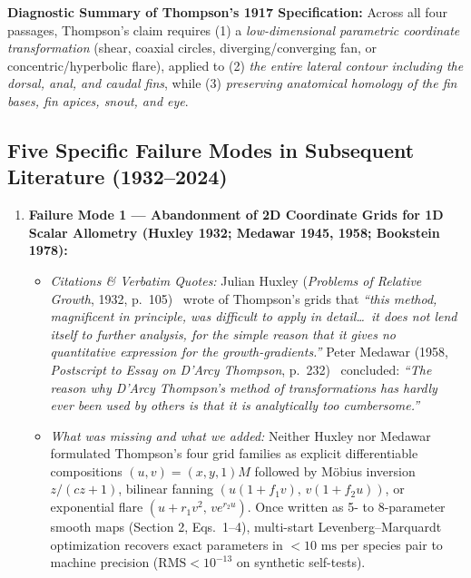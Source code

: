 \documentclass[11pt,a4paper]{article}
\theoremstyle{definition}
\theoremstyle{remark}
\begin{document}
\noindent\textbf{Diagnostic Summary of Thompson's 1917 Specification:} Across all four passages, Thompson's claim requires (1) a \emph{low-dimensional parametric coordinate transformation} (shear, coaxial circles, diverging/converging fan, or concentric/hyperbolic flare), applied to (2) \emph{the entire lateral contour including the dorsal, anal, and caudal fins}, while (3) \emph{preserving anatomical homology of the fin bases, fin apices, snout, and eye}.

\subsection{Five Specific Failure Modes in Subsequent Literature (1932--2024)}

\begin{enumerate}
  \item \textbf{Failure Mode 1 --- Abandonment of 2D Coordinate Grids for 1D Scalar Allometry (Huxley 1932; Medawar 1945, 1958; Bookstein 1978):}
  \begin{itemize}
    \item \emph{Citations \& Verbatim Quotes:} Julian Huxley (\emph{Problems of Relative Growth}, 1932, p.\ 105)~\cite{Huxley1932} wrote of Thompson's grids that \emph{``this method, magnificent in principle, was difficult to apply in detail\dots\ it does not lend itself to further analysis, for the simple reason that it gives no quantitative expression for the growth-gradients.''} Peter Medawar (1958, \emph{Postscript to Essay on D'Arcy Thompson}, p.\ 232)~\cite{Medawar1958} concluded: \emph{``The reason why D'Arcy Thompson's method of transformations has hardly ever been used by others is that it is analytically too cumbersome.''}
    \item \emph{What was missing and what we added:} Neither Huxley nor Medawar formulated Thompson's four grid families as explicit differentiable compositions $(u, v) = (x, y, 1)M$ followed by Möbius inversion $z/(cz+1)$, bilinear fanning $(u(1+f_1 v),\, v(1+f_2 u))$, or exponential flare $(u+r_1 v^2,\, v e^{r_2 u})$. Once written as 5- to 8-parameter smooth maps (Section 2, Eqs.\ 1--4), multi-start Levenberg--Marquardt optimization recovers exact parameters in $<10\text{ ms}$ per species pair to machine precision ($\mathrm{RMS} < 10^{-13}$ on synthetic self-tests).
  \end{itemize}


\end{enumerate}
\end{document}
